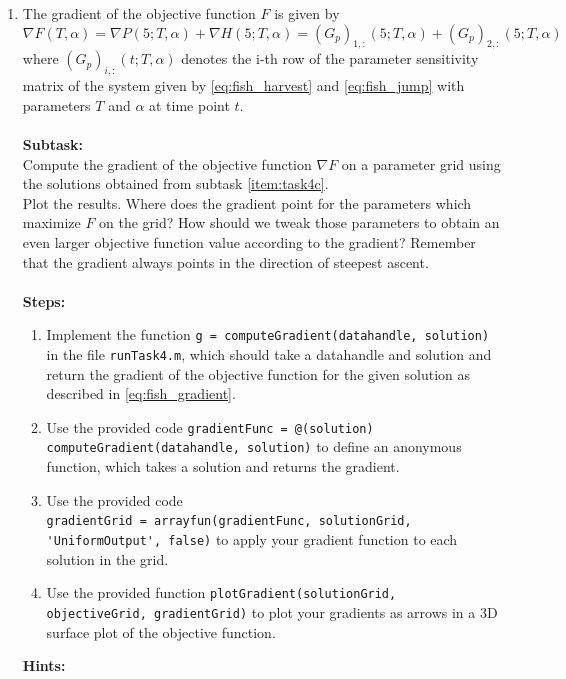 \begin{enumerate}[label=\alph*)]
    \item\label{item:task4e} The gradient of the objective function $F$ is given by
    \begin{equation}\label{eq:fish_gradient}
       \nabla F(T, \alpha) = \nabla P(5; T, \alpha) + \nabla H(5; T, \alpha) = (G_p)_{1,:}(5; T, \alpha) + (G_p)_{2,:}(5; T, \alpha)
    \end{equation}
    where $(G_p)_{i, :}(t; T, \alpha)$ denotes the i-th row of the parameter sensitivity matrix of the system given by \cref{eq:fish_harvest} and \cref{eq:fish_jump} with parameters $T$ and $\alpha$ at time point $t$. \\ \\
    \textbf{Subtask:} \\
    Compute the gradient of the objective function $\nabla F$ on a parameter grid using the solutions obtained from subtask \ref{item:task4c}.\\
    Plot the results. Where does the gradient point for the parameters which maximize $F$ on the grid?
    How should we tweak those parameters to obtain an even larger objective function value according to the gradient?
    Remember that the gradient always points in the direction of steepest ascent.\\ \\
    \textbf{Steps:}
    \begin{enumerate}[label=\arabic*.]
       \item Implement the function \lstinline|g = computeGradient(datahandle, solution)| in the file \texttt{runTask4.m}, which should take a datahandle and solution and return the gradient of the objective function for the given solution as described in \cref{eq:fish_gradient}.
       \item Use the provided code \lstinline|gradientFunc = @(solution) computeGradient(datahandle, solution)| to define an anonymous function, which takes a solution and returns the gradient.
       \item Use the provided code \\\lstinline|gradientGrid = arrayfun(gradientFunc, solutionGrid, 'UniformOutput', false)| to apply your gradient function to each solution in the grid.
       \item Use the provided function \lstinline|plotGradient(solutionGrid, objectiveGrid, gradientGrid)| to plot your gradients as arrows in a 3D surface plot of the objective function.
    \end{enumerate}
    \textbf{Hints:}
    \begin{itemize}

\end{itemize}
\end{enumerate}
